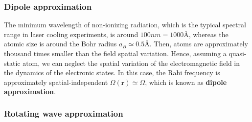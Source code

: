 \subsubsection{Dipole approximation}
\label{sec:dipole-approximation}

The minimum wavelength of non-ionizing radiation, which is the typical spectral range in laser cooling experiments, is around $100 nm = 1000 \textrm{\AA} $, whereas the atomic size is around the Bohr radius $ a_B \simeq 0.5 $\AA. Then, atoms are approximately thousand times smaller than the field spatial variation. Hence, assuming a quasi-static atom, we can neglect the spatial variation of the electromagnetic field in the dynamics of the electronic states. In this case, the Rabi frequency is approximately spatial-independent $ \Omega(\mathbf{r}) \simeq \Omega $, which is known as \textbf{dipole approximation}.

\subsubsection{Rotating wave approximation}
\label{sec:rotating-wave-approximation}

